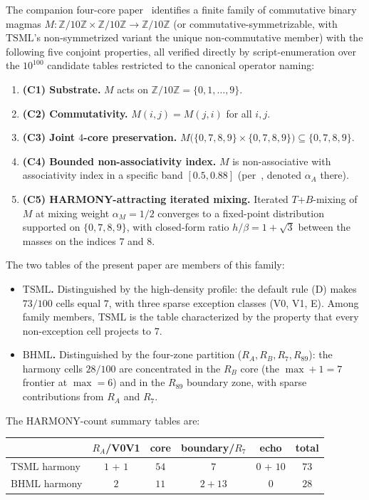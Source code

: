 \documentclass[11pt,reqno]{amsart}
\theoremstyle{plain}
\theoremstyle{definition}
\theoremstyle{remark}
\newcommand{\Z}{\mathbb{Z}}
\newcommand{\Zten}{\Z/10\Z}
\newcommand{\TSML}{\mathrm{TSML}}
\newcommand{\BHML}{\mathrm{BHML}}
\begin{document}
The companion four-core paper~\cite{FourCore} identifies a finite
family of commutative binary magmas $M : \Zten \times \Zten \to
\Zten$ (or commutative-symmetrizable, with $\TSML$'s
non-symmetrized variant the unique non-commutative member) with
the following five conjoint properties, all verified directly by
script-enumeration over the $10^{100}$ candidate tables restricted
to the canonical operator naming:

\begin{enumerate}
\item \textbf{(C1) Substrate.}
$M$ acts on $\Zten = \{0, 1, \ldots, 9\}$.
\item \textbf{(C2) Commutativity.}
$M(i, j) = M(j, i)$ for all $i, j$.
\item \textbf{(C3) Joint $4$-core preservation.}
$M\bigl(\{0, 7, 8, 9\} \times \{0, 7, 8, 9\}\bigr) \subseteq
\{0, 7, 8, 9\}$.
\item \textbf{(C4) Bounded non-associativity index.}
$M$ is non-associative with associativity index in a specific
band $[0.5, 0.88]$ (per~\cite{FourCore}, denoted $\alpha_A$
there).
\item \textbf{(C5) HARMONY-attracting iterated mixing.}
Iterated $T$+$B$-mixing of $M$ at mixing weight $\alpha_M = 1/2$
converges to a fixed-point distribution supported on
$\{0, 7, 8, 9\}$, with closed-form ratio $h/\beta = 1 + \sqrt{3}$
between the masses on the indices $7$ and $8$.
\end{enumerate}

The two tables of the present paper are members of this family:

\begin{itemize}\setlength\itemsep{2pt}
\item \textbf{$\TSML$.} Distinguished by the high-density profile:
the default rule (D) makes $73/100$ cells equal $7$, with three
sparse exception classes (V0, V1, E). Among family members,
$\TSML$ is the table characterized by the property that every
non-exception cell projects to $7$.
\item \textbf{$\BHML$.} Distinguished by the four-zone partition
($R_A, R_B, R_7, R_{89}$): the harmony cells $28/100$ are
concentrated in the $R_B$ core (the $\max + 1 = 7$ frontier at
$\max = 6$) and in the $R_{89}$ boundary zone, with sparse
contributions from $R_A$ and $R_7$.
\end{itemize}

The HARMONY-count summary tables are:
\begin{center}
\begin{tabular}{l|cccc|c}
& $R_A$/V0V1 & core & boundary/$R_7$ & echo & total \\ \hline
$\TSML$ harmony & $1$ + $1$ & $54$ & $7$ & $0$ + $10$  & $73$ \\
$\BHML$ harmony & $2$       & $11$ & $2 + 13$ & $0$ & $28$
\end{tabular}
\end{center}
\end{document}
